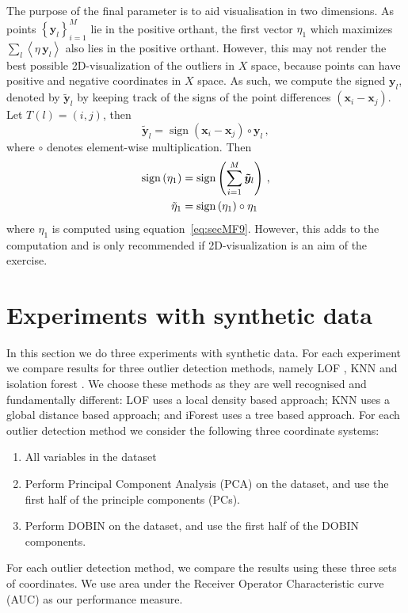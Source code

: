 \documentclass[11pt]{article}
\DeclareMathOperator{\sign}{sign}
\begin{document}
The purpose of the final parameter is to aid visualisation in two dimensions. As points $ \left\{ \bm{y}_{l} \right \}_{i=1}^M$ lie in the positive orthant, the first vector $\eta_1$ which maximizes $\sum_l \left\langle \eta\, \bm{y}_l \right\rangle$ also lies in the positive orthant. However, this may not render the best possible 2D-visualization of the outliers in $X$ space, because points can have positive and negative coordinates in  $X$ space. As such, we compute the signed $\bm{y}_{l}$, denoted by $\bm{\tilde{y}}_l$ by keeping track of the signs of the point differences $\left( \bm{x}_i - \bm{x}_j \right)$. Let $T(l) = \left( i, j \right)$, then 
\begin{equation}\label{eq:secMF16}
    \bm{\tilde{y}}_l = \sign\left( \bm{x}_i - \bm{x}_j \right) \circ \bm{y}_{l}  \, , 
\end{equation}
where $\circ$ denotes element-wise multiplication. Then 
\begin{align}\label{eq:secMF17}
    \sign \left(\eta_1 \right) & = \sign \left( \sum_{i=1}^M  \bm{\tilde{y}}_l \right) \, , \notag \\
    \tilde\eta_1 & = \sign \left(\eta_1 \right) \circ \eta_1 
\end{align}
 where $\eta_1 $ is computed using equation~\eqref{eq:secMF9}. However, this adds to the computation and is only recommended if 2D-visualization is an aim of the exercise. 

\section{Experiments with synthetic data}\label{sec:synthetic}
In this section we do three experiments with synthetic data. For each experiment we compare results for three outlier detection methods, namely LOF \citep{breunig2000lof}, KNN \citep{ramaswamy2000efficient} and isolation forest \citep{liu2008isolation}. We choose these methods as they are well recognised and fundamentally different: LOF uses a local density based approach; KNN uses a global distance based approach; and iForest uses a  tree based approach.  For each outlier detection method we consider the following three coordinate systems:  
\begin{enumerate}  
\item All variables in the dataset
\item Perform Principal Component Analysis (PCA) on the dataset, and use the first half of the principle components (PCs).
\item Perform DOBIN on the dataset, and use the first half of the DOBIN components. 
\end{enumerate}
For each outlier detection method, we compare the results using these three sets of coordinates. We use area under the Receiver Operator Characteristic curve (AUC) as our performance measure. 
\end{document}

